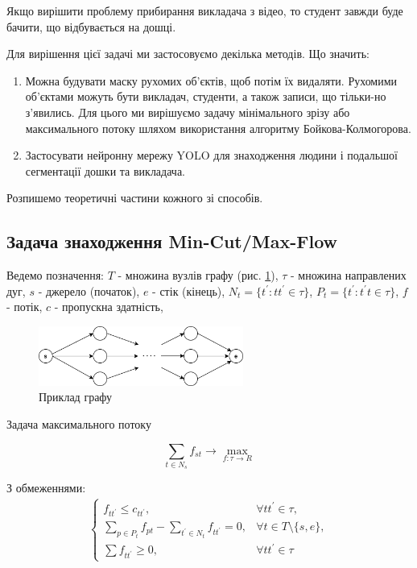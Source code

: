 Якщо вирішити проблему прибирання викладача з відео, то студент завжди 
буде бачити, що відбувається на дошці.

Для вирішення цієї задачі ми застосовуємо декілька методів.
Що значить:
\begin{enumerate}
    \item Можна будувати маску рухомих об'єктів,
          щоб потім їх видаляти. Рухомими об'єктами можуть бути викладач, 
          студенти, а також записи, що тільки-но з'явились.
          Для цього ми вирішуємо задачу мінімального зрізу або максимального потоку
          шляхом використання алгоритму Бойкова-Колмогорова.
    \item Застосувати нейронну мережу YOLO для знаходження людини
          і подальшої сегментації дошки та викладача.
\end{enumerate}

Розпишемо теоретичні частини кожного зі способів.

\subsection{Задача знаходження Min-Cut/Max-Flow}

Ведемо позначення:
$T$ - множина вузлів графу (рис. \ref{fig:graph_example}), 
$\tau$ - множина направлених дуг,
$s$ - джерело (початок),
$e$ - стік (кінець),
$N_t = \{t^{'}: tt^{'} \in \tau \}$,
$P_t = \{t^{'}: t^{'}t \in \tau \}$,
$f$ - потік,
$c$ - пропускна здатність,

\begin{figure}[h]
    \centering
    \includegraphics[width=0.6\textwidth]{images/graph_example}
    \caption{Приклад графу}
    \label{fig:graph_example}
\end{figure}

Задача максимального потоку

\begin{equation}
    \sum_{t \in N_s} f_{st} \rightarrow \max_{f: \tau \rightarrow R }
\end{equation}

З обмеженнями: 
\begin{equation} 
    \begin{gathered}
        \begin{cases}
            f_{tt^{'}} \leq  c_{tt^{'}}, &  \forall tt^{'}  \in \tau , \\

            \sum_{p \in P_t} f_{pt} - \sum_{t^{'} \in N_t} f_{tt^{'}} = 0, & 
            \forall t \in T \setminus \{s,e\}, \\

            \sum f_{tt^{'}} \geq 0, & \forall tt^{'}  \in \tau
        \end{cases}
\end{gathered}
\end{equation}

